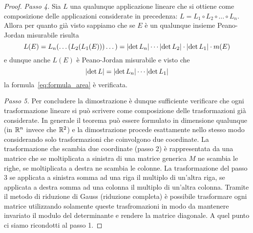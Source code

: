 \begin{proof}
\emph{Passo 4.}
Sia $L$ una qualunque applicazione lineare che si ottiene come
composizione delle applicazioni considerate in precedenza: $L= L_1 \circ L_2\circ  \dots \circ L_n$. Allora per quanto già visto sappiamo
che se $E$ è un qualunque insieme Peano-Jordan misurabile risulta
\[
L(E) = L_n(\dots(L_2(L_1(E)))\dots)
     = {\left|\det L_n\right|} \cdots {\left|\det L_2\right|} \cdot {\left|\det L_1\right|} \cdot m(E)
\]
e dunque anche $L(E)$ è Peano-Jordan misurabile e visto che
\[
 {\left|\det L\right|} = {\left|\det L_n\right|} \cdots {\left|\det L_1\right|}
\]
la formula~\eqref{eq:formula_area} è verificata.

\emph{Passo 5.}
Per concludere la dimostrazione è dunque sufficiente
verificare che ogni trasformazione lineare si può scrivere come composizione delle trasformazioni già considerate.
In generale il teorema può essere formulato in dimensione qualunque (in $\mathbb R^n$ invece che $\mathbb R^2$) e la dimostrazione procede esattamente nello stesso modo considerando solo trasformazioni che coinvolgono due coordinate. La trasformazione che scambia due coordinate (passo 2) è rappresentata da una matrice che se moltiplicata a sinistra di una matrice generica $M$ ne scambia le righe, se moltiplicata a destra ne scambia le colonne. La trasformazione del passo 3 se applicata a sinistra somma ad una riga il multiplo di un'altra riga, se applicata a destra somma ad una colonna il multiplo di un'altra colonna.
Tramite il metodo di riduzione di Gauss (riduzione completa) è possibile trasformare ogni matrice utilizzando solamente queste trasfromazioni in modo da mantenere invariato il modulo del determinante e rendere la matrice diagonale. A quel punto ci siamo ricondotti al passo 1.


\end{proof}
